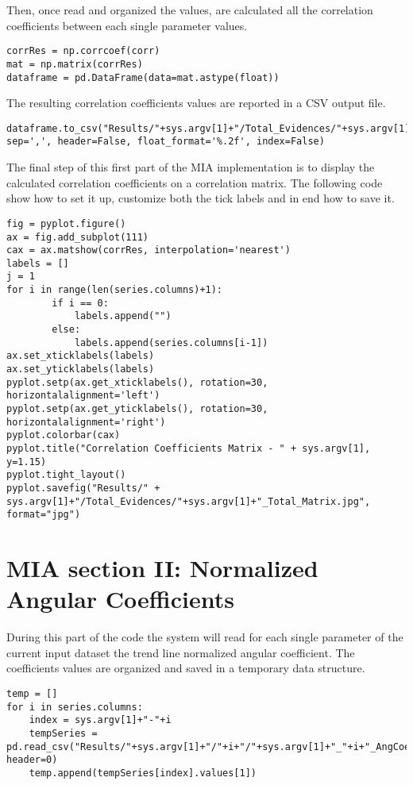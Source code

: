 Then, once read and organized the values, are calculated all the correlation coefficients between each single parameter values.
\begin{lstlisting}
corrRes = np.corrcoef(corr)
mat = np.matrix(corrRes)
dataframe = pd.DataFrame(data=mat.astype(float))
\end{lstlisting} 

The resulting correlation coefficients values are reported in a CSV output file.
\begin{lstlisting}
dataframe.to_csv("Results/"+sys.argv[1]+"/Total_Evidences/"+sys.argv[1]+"_CorrCoeff.csv", sep=',', header=False, float_format='%.2f', index=False)
\end{lstlisting} 

The final step of this first part of the MIA implementation is to display the calculated correlation coefficients on a correlation matrix. The following code show how to set it up, customize both the tick labels and in end how to save it.
\begin{lstlisting}
fig = pyplot.figure()
ax = fig.add_subplot(111)
cax = ax.matshow(corrRes, interpolation='nearest')
labels = []
j = 1
for i in range(len(series.columns)+1):
		if i == 0:
			labels.append("")
		else:
			labels.append(series.columns[i-1])
ax.set_xticklabels(labels)
ax.set_yticklabels(labels)
pyplot.setp(ax.get_xticklabels(), rotation=30, horizontalalignment='left')
pyplot.setp(ax.get_yticklabels(), rotation=30, horizontalalignment='right')
pyplot.colorbar(cax)
pyplot.title("Correlation Coefficients Matrix - " + sys.argv[1], y=1.15)
pyplot.tight_layout()
pyplot.savefig("Results/" + sys.argv[1]+"/Total_Evidences/"+sys.argv[1]+"_Total_Matrix.jpg", format="jpg")

\end{lstlisting}
\section{MIA section II: Normalized Angular Coefficients}
\label{MIA_section_II}

During this part of the code the system will read for each single parameter of the current input dataset the trend line normalized angular coefficient. The coefficients values are organized and saved in a temporary data structure.
\begin{lstlisting}
temp = [] 
for i in series.columns:
	index = sys.argv[1]+"-"+i
	tempSeries = pd.read_csv("Results/"+sys.argv[1]+"/"+i+"/"+sys.argv[1]+"_"+i+"_AngCoeff.csv", header=0)
	temp.append(tempSeries[index].values[1])
\end{lstlisting}

